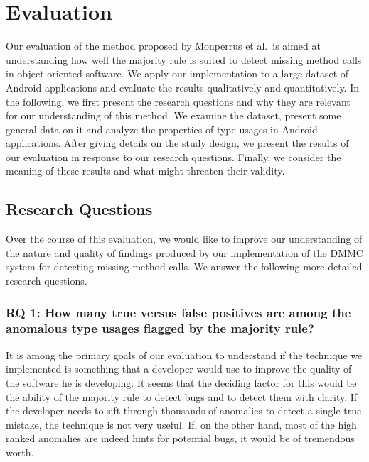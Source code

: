 \chapter{Evaluation}\label{ch:eval}

Our evaluation of the method proposed by Monperrus et al.\ is aimed at understanding how well the majority rule is suited to detect missing method calls in object oriented software.
We apply our implementation to a large dataset of Android applications and evaluate the results qualitatively and quantitatively.
In the following, we first present the research questions and why they are relevant for our understanding of this method.
We examine the dataset, present some general data on it and analyze the properties of type usages in Android applications.
After giving details on the study design, we present the results of our evaluation in response to our research questions.
Finally, we consider the meaning of these results and what might threaten their validity.

\section{Research Questions}\label{sc:rq}

Over the course of this evaluation, we would like to improve our understanding of the nature and quality of findings produced by our implementation of the $\text{DMMC}$ system for detecting missing method calls.
We answer the following more detailed research questions.

\subsection*{RQ 1: How many true versus false positives are among the anomalous type usages flagged by the majority rule?}

It is among the primary goals of our evaluation to understand if the technique we implemented is something that a developer would use to improve the quality of the software he is developing.
It seems that the deciding factor for this would be the ability of the majority rule to detect bugs and to detect them with clarity.
If the developer needs to sift through thousands of anomalies to detect a single true mistake, the technique is not very useful.
If, on the other hand, most of the high ranked anomalies are indeed hints for potential bugs, it would be of tremendous worth.

